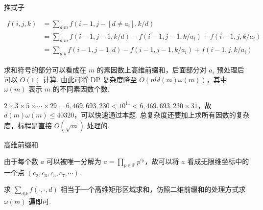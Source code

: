 \begin{frame}{推式子}
	
	$$\begin{aligned}
		f(i, j, k) &= \sum_{d|m} f\left(i - 1, j - [d \ne a_i], k / d\right)\\
		&= \sum_{d|m} f\left(i - 1, j - 1, k / d\right) - f\left(i - 1, j - 1, k / a_i\right) + f\left(i - 1, j, k / a_i\right)\\
		&= \sum_{d|k} f\left(i - 1, j - 1, d\right) - f\left(i - 1, j - 1, k / a_i\right) + f\left(i - 1, j, k / a_i\right)
	\end{aligned}$$

	求和符号的部分可以看成在 $m$ 的素因数上高维前缀和，后面部分对 $a_i$ 预处理后可以 $O(1)$ 计算. 由此可将 DP 复杂度降至 $O(nld(m)\omega(m))$，其中 $\omega(m)$ 表示 $m$ 的不同素因数个数.

	$2\times 3\times 5\times \cdots \times 29 = 6,469,693,230<10^{11} < 6,469,693,230\times 31$，故 $d(m)\omega(m) \le 40320$，可以快速通过本题. 总复杂度还要加上求所有因数的复杂度，标程是直接 $O\left(\sqrt{m}\right)$ 处理的.

\end{frame}

\begin{frame}{高维前缀和}
	
	由于每个数 $a$ 可以被唯一分解为 $a=\prod_{p\in\mathbb{P}} p^{c_p}$，故可以将 $a$ 看成无限维坐标中的一个点 $\left(c_2, c_3, c_5, c_7, \cdots\right)$.

	求 $\sum_{d|k} f(\cdot, \cdot, d)$ 相当于一个高维矩形区域求和，仿照二维前缀和的处理方式求 $\omega(m)$ 遍即可.

\end{frame}